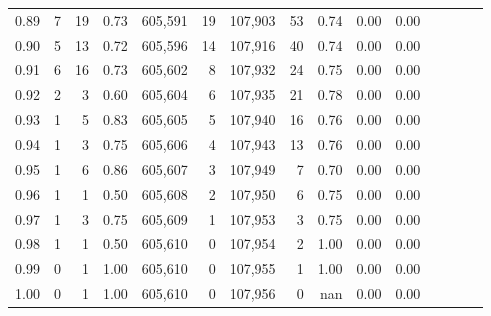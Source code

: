 \begin{tabular}{rrrcrrrrrrrrrrr}
0.89 &       7 &     19 &                                       0.73 &  605,591 &       19 &  107,903 &       53 &  0.74 &  0.00 &                         0.00 \\
0.90 &       5 &     13 &                                       0.72 &  605,596 &       14 &  107,916 &       40 &  0.74 &  0.00 &                         0.00 \\
0.91 &       6 &     16 &                                       0.73 &  605,602 &        8 &  107,932 &       24 &  0.75 &  0.00 &                         0.00 \\
0.92 &       2 &      3 &                                       0.60 &  605,604 &        6 &  107,935 &       21 &  0.78 &  0.00 &                         0.00 \\
0.93 &       1 &      5 &                                       0.83 &  605,605 &        5 &  107,940 &       16 &  0.76 &  0.00 &                         0.00 \\
0.94 &       1 &      3 &                                       0.75 &  605,606 &        4 &  107,943 &       13 &  0.76 &  0.00 &                         0.00 \\
0.95 &       1 &      6 &                                       0.86 &  605,607 &        3 &  107,949 &        7 &  0.70 &  0.00 &                         0.00 \\
0.96 &       1 &      1 &                                       0.50 &  605,608 &        2 &  107,950 &        6 &  0.75 &  0.00 &                         0.00 \\
0.97 &       1 &      3 &                                       0.75 &  605,609 &        1 &  107,953 &        3 &  0.75 &  0.00 &                         0.00 \\
0.98 &       1 &      1 &                                       0.50 &  605,610 &        0 &  107,954 &        2 &  1.00 &  0.00 &                         0.00 \\
0.99 &       0 &      1 &                                       1.00 &  605,610 &        0 &  107,955 &        1 &  1.00 &  0.00 &                         0.00 \\
1.00 &       0 &      1 &                                       1.00 &  605,610 &        0 &  107,956 &        0 &   nan &  0.00 &                         0.00 \\
\bottomrule
\end{tabular}
